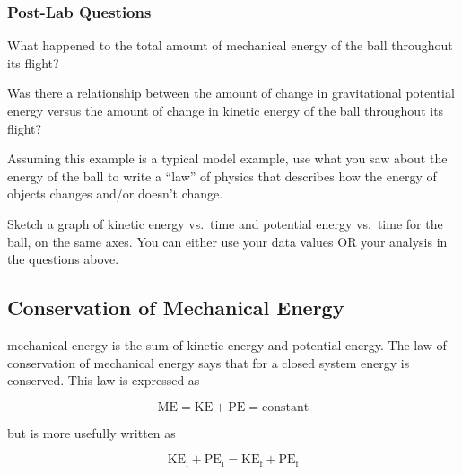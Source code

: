 \documentclass{article}
\numberwithin{equation}{section}
\numberwithin{figure}{section}
\begin{document}
\subsubsection*{Post-Lab Questions}

\begin{exercise}
    What happened to the total amount of mechanical energy of the ball throughout its flight?
\end{exercise}

\begin{exercise}
    Was there a relationship between the amount of change in gravitational potential energy versus the amount of change in kinetic energy of the ball throughout its flight?
\end{exercise}

\begin{exercise}
    Assuming this example is a typical model example, use what you saw about the energy of the ball to write a ``law'' of physics that describes how the energy of objects changes and/or doesn't change. 
\end{exercise}

\begin{exercise}
    Sketch a graph of kinetic energy vs.~time and potential energy vs.~time for the ball, on the same axes. You can either use your data values OR your analysis in the questions above.
\end{exercise}






\clearpage

\subsection{Conservation of Mechanical Energy} \label{KRxiCV}

\Gls{mechanical energy} is the sum of kinetic energy and potential energy. The law of conservation of mechanical energy says that for a closed system energy is conserved. This law is expressed as

\begin{equation} \label{QyLUh5}
    \mathrm{ME} = \mathrm{KE} + \mathrm{PE} = \mathrm{constant}
\end{equation}

but is more usefully written as

\begin{equation} \label{yOUj22}
    \mathrm{KE_i} + \mathrm{PE_i} = \mathrm{KE_f} + \mathrm{PE_f}
\end{equation}
\end{document}
